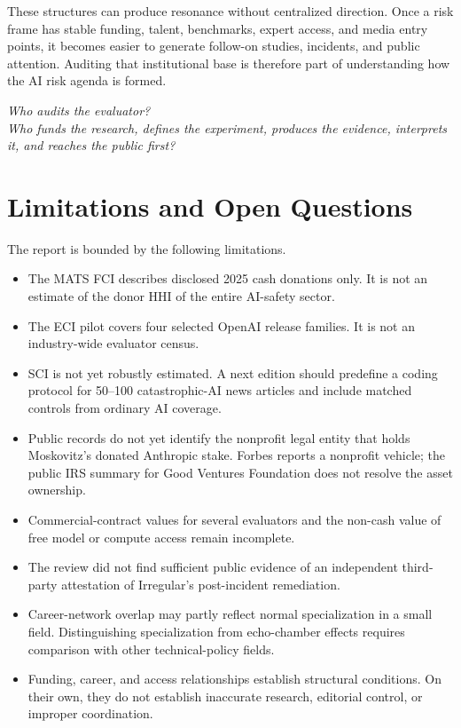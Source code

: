 \documentclass[11pt,twoside]{article}
\begin{document}
These structures can produce resonance without centralized direction. Once a risk frame has stable funding, talent, benchmarks, expert access, and media entry points, it becomes easier to generate follow-on studies, incidents, and public attention. Auditing that institutional base is therefore part of understanding how the AI risk agenda is formed.

\begin{evidencebox}
\centering
\Large\itshape Who audits the evaluator?\\[2mm]
\normalsize Who funds the research, defines the experiment, produces the evidence, interprets it, and reaches the public first?
\end{evidencebox}

\clearpage
\section{Limitations and Open Questions}
The report is bounded by the following limitations.
\begin{itemize}
\item The MATS FCI describes disclosed 2025 cash donations only. It is not an estimate of the donor HHI of the entire AI-safety sector.
\item The ECI pilot covers four selected OpenAI release families. It is not an industry-wide evaluator census.
\item SCI is not yet robustly estimated. A next edition should predefine a coding protocol for 50--100 catastrophic-AI news articles and include matched controls from ordinary AI coverage.
\item Public records do not yet identify the nonprofit legal entity that holds Moskovitz's donated Anthropic stake. Forbes reports a nonprofit vehicle; the public IRS summary for Good Ventures Foundation does not resolve the asset ownership.
\item Commercial-contract values for several evaluators and the non-cash value of free model or compute access remain incomplete.
\item The review did not find sufficient public evidence of an independent third-party attestation of Irregular's post-incident remediation.
\item Career-network overlap may partly reflect normal specialization in a small field. Distinguishing specialization from echo-chamber effects requires comparison with other technical-policy fields.
\item Funding, career, and access relationships establish structural conditions. On their own, they do not establish inaccurate research, editorial control, or improper coordination.
\end{itemize}
\end{document}
